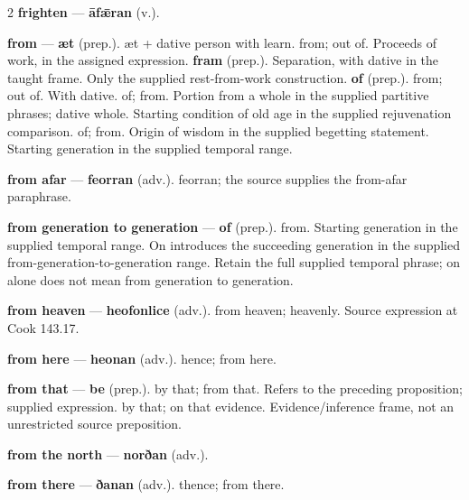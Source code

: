 \begin{multicols}{2}
\textbf{frighten} — \textbf{āfǣran} (v.).\par
\textbf{from} — \textbf{æt} (prep.). æt + dative person with learn. from; out of. Proceeds of work, in the assigned expression. \textbf{fram} (prep.). Separation, with dative in the taught frame. Only the supplied rest-from-work construction. \textbf{of} (prep.). from; out of. With dative. of; from. Portion from a whole in the supplied partitive phrases; dative whole. Starting condition of old age in the supplied rejuvenation comparison. of; from. Origin of wisdom in the supplied begetting statement. Starting generation in the supplied temporal range.\par
\textbf{from afar} — \textbf{feorran} (adv.). feorran; the source supplies the from-afar paraphrase.\par
\textbf{from generation to generation} — \textbf{of} (prep.). from. Starting generation in the supplied temporal range. On introduces the succeeding generation in the supplied from-generation-to-generation range. Retain the full supplied temporal phrase; on alone does not mean from generation to generation.\par
\textbf{from heaven} — \textbf{heofonlice} (adv.). from heaven; heavenly. Source expression at Cook 143.17.\par
\textbf{from here} — \textbf{heonan} (adv.). hence; from here.\par
\textbf{from that} — \textbf{be} (prep.). by that; from that. Refers to the preceding proposition; supplied expression. by that; on that evidence. Evidence/inference frame, not an unrestricted source preposition.\par
\textbf{from the north} — \textbf{norðan} (adv.).\par
\textbf{from there} — \textbf{ðanan} (adv.). thence; from there.\par

\end{multicols}
